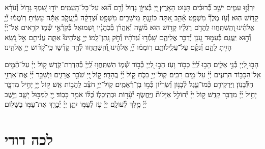 \documentclass[twoside, openany, parskip=half, 11pt]{book}
\begin{document}
יִרְגְּ֯ז֣וּ עַמִּ֑ים ישֵׁ֥ב כְּ֝֯רוּבִ֗ים תָּנ֥וּט הָאָֽרֶץ׃
֖יְיָ בְּ֯צִיּוֹ֣ן גָּד֑וֹל וְ֯רָ֥ם ה֝֗וּא עַל־כׇּל־הָֽעַמִּֽים׃
יוֹד֣וּ שִׁ֭מְךָ גָּד֥וֹל וְ֯נוֹרָ֗א קָד֥וֹשׁ הֽוּא׃
וְ֯עֹ֥ז מֶלֶךְ֘ מִשְׁפָּ֢ט אָ֫הֵ֥ב אַ֭תָּה כּוֹנַ֣נְתָּ מֵּֽישָׁרִ֑ים מִשְׁפָּ֥ט וּ֝צְדָקָ֗ה בְּ֯יַֽעֲקֹ֤ב אַתָּ֬ה עָשִֽׂיתָ׃
רֽוֹמֲמ֡וּ יְ֘יָ֤ אֱלֹהֵ֗ינוּ ֖וְהִֽשְׁתַּֽחֲווּ לַֽהֲדֹ֥ם רַגְלָ֗יו קָד֥וֹשׁ הֽוּא׃
מ֘שֶׁ֤ה וְ֯אַֽהֲרֹ֨ן בְּ֯כֹֽהֲנָ֗יו וּ֭שְׁמוּאֵל בְּ֯קֹֽרְ֯אֵ֣י שְׁ֯מ֑וֹ קֹרִ֥אים אֶל־יְ֜יָ֗ וְ֯ה֣וּא יַֽעֲנֵֽם׃
בְּ֯עַמּ֣וּד עָ֭נָן יְ֯דַבֵּ֣ר אֲלֵיהֶ֑ם שָֽׁמְ֯ר֥וּ עֵֽ֝דֹתָ֗יו וְ֯חֹ֣ק נָֽתַן־לָֽמוֹ׃
יְיָ֣ אֱלֹהֵינוּ֘ אַתָּ֢ה עֲנִ֫יתָ֥ם אֵ֣ל נֹ֭שֵֽׂא הָיִ֣יתָ לָהֶ֑ם וְ֝֯נֹקֵ֗ם עַל־עֲלִֽילוֹתָֽם׃
רֽוֹמֲמ֡וּ יְ֘יָ֤ אֱלֹהֵ֗ינוּ וְ֭֯הִֽשְׁתַּֽחֲווּ לְ֯הַ֣ר קָדְ֯שׁ֑וֹ כִּֽי־קָ֝ד֗וֹשׁ יְיָ֥ אֱלֹהֵֽינוּ׃

הָב֣וּ לַ֭יְיָ בְּ֯נֵ֣י אֵלִ֑ים הָב֥וּ לַֽ֝יְיָ֗ כָּב֥וֹד וָעֹֽז׃
הָב֣וּ לַ֭יְיָ כְּ֯ב֣וֹד שְׁ֯מ֑וֹ הִשְׁתַּֽחֲו֥וּ לַֽ֝יְיָ֗ בְּ֯הַדְרַת־קֹֽדֶשׁ׃
ק֥וֹל יְיָ֗ עַל־הַ֫מָּ֥יִם אֵֽל־הַכָּב֥וֹד הִרְעִ֑ים יְ֜יָ֗ עַל־מַ֥יִם רַבִּֽים׃
קֽוֹל־יְיָ֥ בַּכֹּ֑חַ ק֥וֹל יְ֜יָ֗ בֶּֽהָדָֽר׃
ק֣וֹל ֖יְיָ שֹׁבֵ֣ר אֲרָזִ֑ים וַיְשַׁבֵּ֥ר יְ֜יָ֗ אֶת־אַרְזֵ֥י הַלְּ֯בָנֽוֹן׃
וַיַּרְקִידֵ֥ם כְּ֯מוֹ־עֵ֑גֶל לְ֯בָנ֥וֹן וְ֝֯שִׂרְי֗וֹן כְּ֯מ֣וֹ בֶן־רְ֯אֵמִֽים׃
קֽוֹל־יְיָ֥ חֹצֵ֗ב לַֽהֲב֥וֹת אֵֽשׁ׃
ק֣וֹל יְ֖יָ֥ יָחִ֣יל מִדְבָּ֑ר יָחִ֥יל יְ֜יָ֗ מִדְבַּ֥ר קָדֵֽשׁ׃
ק֣וֹל יְיָ֨ יְ֯חוֹלֵ֣ל אַיָּלוֹת֘ וַיֶּֽחֱשׂ֢ף יְ֯עָ֫ר֥וֹת וּבְהֵֽיכָל֑וֹ כֻּ֝לּ֗וֹ אֹמֵ֥ר כָּבֽוֹד׃
יְ֖יָ לַמַּבּ֣וּל יָשָׁ֑ב וַיֵּ֥שֶׁב יְ֜יָ֗ מֶ֣לֶךְ לְ֯עוֹלָֽם׃
יְיָ֗ עֹ֖ז לְ֯עַמּ֣וֹ יִתֵּ֑ן יְיָ֓ יְ֯בָרֵ֖ךְ אֶת־עַמּ֣וֹ בַשָּׁלֽוֹם׃


\section*{ לכה דודי }

\newcommand{\lechadodi}{\textbf{לְכָה דוֹדִי לִקְרַאת כַּלָּה פְּ֯נֵי שַׁבָּת נְ֯קַבְּ֯לָה:}}
\end{document}
